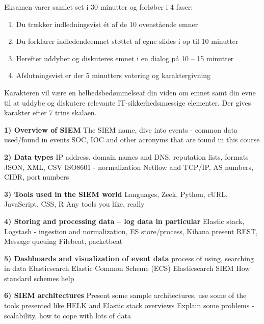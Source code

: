 \documentclass[Screen16to9,17pt]{foils}
\begin{document}

Eksamen varer samlet set i 30 minutter og forløber i 4 faser:

\begin{enumerate}
  \item Du trækker indledningsvist ét af de 10 ovenstående emner
  \item Du forklarer indledendeemnet støttet af egne slides i op til 10 minutter
  \item Herefter uddyber og diskuteres emnet i en dialog på 10 -- 15 minutter
  \item Afslutningsvist er der 5 minutters votering og karaktergivning
\end{enumerate}

Karakteren vil være en helhedsbedømmelseaf din viden om emnet samt din evne til at uddybe og diskutere relevante IT-sikkerhedsmæssige elementer. Der gives karakter efter 7 trins skalaen.



\begin{list2}
\item {\bf 1) Overview of SIEM}
The SIEM name, dive into events - common data used/found in events SOC, IOC and other acronyms that are found in this course

\item {\bf 2) Data types}
IP address, domain names and DNS, reputation lists, formats JSON, XML, CSV ISO8601 - normalization Netflow and TCP/IP, AS numbers, CIDR, port numbers

\item {\bf 3) Tools used in the SIEM world}
Languages, Zeek, Python, cURL, JavaScript, CSS, R Any tools you like, really

\item {\bf 4) Storing and processing data -- log data in particular}
Elastic stack, Logstash - ingestion and normalization, ES store/process, Kibana present REST, Message queuing Filebeat, packetbeat

\item {\bf 5) Dashboards and visualization of event data}
process of using, searching in data Elasticsearch Elastic Common Scheme (ECS) Elasticsearch SIEM How standard schemes help

\item {\bf 6) SIEM architectures}
Present some sample architectures, use some of the tools presented like HELK and Elastic stack overviews
Explain some problems - scalability, how to cope with lots of data
\end{list2}
\end{document}
